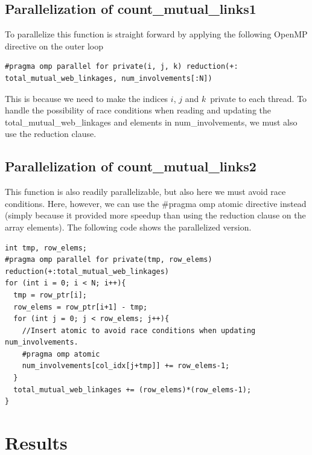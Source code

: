 \documentclass[english,notitlepage, reprint]{revtex4-1}  %
\begin{document}
\subsection*{Parallelization of count\_mutual\_links1}
To parallelize this function is straight forward by applying the following OpenMP directive on the outer loop
\begin{lstlisting}[style=customc]
#pragma omp parallel for private(i, j, k) reduction(+: total_mutual_web_linkages, num_involvements[:N])
\end{lstlisting}
This is because we need to make the indices $i$, $j$ and $k$ private to each thread. To handle the possibility of race conditions when reading and updating the total\_mutual\_web\_linkages
and elements in num\_involvements, we must also use the reduction clause.

\subsection*{Parallelization of count\_mutual\_links2}
This function is also readily parallelizable, but also here we must avoid race conditions. Here, however, we can use the \#pragma omp atomic directive instead (simply because it provided more speedup than using the reduction clause on the array elements). The following code shows the parallelized version.
\begin{lstlisting}[style=customc]
int tmp, row_elems;
#pragma omp parallel for private(tmp, row_elems) reduction(+:total_mutual_web_linkages)
for (int i = 0; i < N; i++){
  tmp = row_ptr[i];
  row_elems = row_ptr[i+1] - tmp;
  for (int j = 0; j < row_elems; j++){
    //Insert atomic to avoid race conditions when updating num_involvements.
    #pragma omp atomic
    num_involvements[col_idx[j+tmp]] += row_elems-1;
  }
  total_mutual_web_linkages += (row_elems)*(row_elems-1);
}
\end{lstlisting}


\section{Results}
\end{document}
